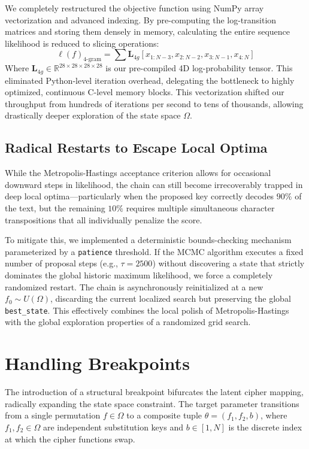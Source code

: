 \documentclass[11pt]{article}
\begin{document}
We completely restructured the objective function using NumPy array vectorization and advanced indexing. By pre-computing the log-transition matrices and storing them densely in memory, calculating the entire sequence likelihood is reduced to slicing operations:
\begin{equation}
    \ell(f)_{\text{4-gram}} = \sum \mathbf{L}_{4g}\left[ x_{1:N-3}, x_{2:N-2}, x_{3:N-1}, x_{4:N} \right]
\end{equation}
Where $\mathbf{L}_{4g} \in \mathbb{R}^{28 \times 28 \times 28 \times 28}$ is our pre-compiled 4D log-probability tensor. This eliminated Python-level iteration overhead, delegating the bottleneck to highly optimized, continuous C-level memory blocks. This vectorization shifted our throughput from hundreds of iterations per second to tens of thousands, allowing drastically deeper exploration of the state space $\Omega$.

\subsection{Radical Restarts to Escape Local Optima}
While the Metropolis-Hastings acceptance criterion allows for occasional downward steps in likelihood, the chain can still become irrecoverably trapped in deep local optima---particularly when the proposed key correctly decodes $90\%$ of the text, but the remaining $10\%$ requires multiple simultaneous character transpositions that all individually penalize the score.

To mitigate this, we implemented a deterministic bounds-checking mechanism parameterized by a \texttt{patience} threshold. If the MCMC algorithm executes a fixed number of proposal steps (e.g., $\tau = 2500$) without discovering a state that strictly dominates the global historic maximum likelihood, we force a completely randomized restart. The chain is asynchronously reinitialized at a new $f_0 \sim U(\Omega)$, discarding the current localized search but preserving the global \texttt{best\_state}. This effectively combines the local polish of Metropolis-Hastings with the global exploration properties of a randomized grid search.

\section{Handling Breakpoints}

The introduction of a structural breakpoint bifurcates the latent cipher mapping, radically expanding the state space constraint. The target parameter transitions from a single permutation $f \in \Omega$ to a composite tuple $\theta = (f_1, f_2, b)$, where $f_1, f_2 \in \Omega$ are independent substitution keys and $b \in [1, N]$ is the discrete index at which the cipher functions swap.
\end{document}
